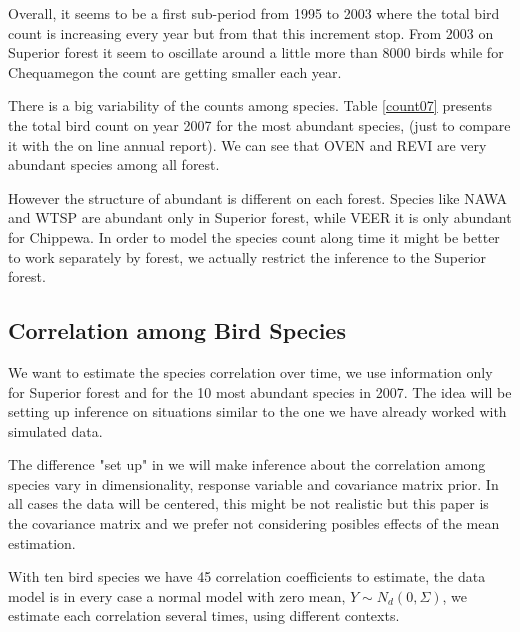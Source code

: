 \documentclass{article}
\begin{document}
Overall, it seems to be a first sub-period from 1995 to 2003 where the total bird count is increasing every year but from that this increment stop. From 2003 on Superior forest it seem to oscillate around a little more than 8000 birds while for Chequamegon the count are getting smaller each year. 



There is a big variability of the counts among species. Table \ref{count07} presents the total bird count on year 2007 for the most abundant species, (just to compare it with the on line annual report). We can see that OVEN and REVI are very abundant species among all forest. 

However the structure of abundant is different on each forest. Species like NAWA and WTSP are abundant only in Superior forest, while VEER it is only abundant for Chippewa. In order to model the species count along time it might be better to work separately by forest, we actually restrict the inference to the Superior forest. 

\subsection{ Correlation among Bird Species}

We want to estimate the species correlation over time, we use information only for Superior forest and for the 10 most abundant species in 2007. The idea will be setting up inference on situations similar to the one we have already worked with simulated data. 

The difference "set up" in we will make inference about the correlation among species vary in dimensionality, response variable and covariance matrix prior. In all cases the data will be centered, this might be not realistic but this paper is the covariance matrix and we prefer not considering posibles effects of the mean estimation.  

With ten bird species we have 45 correlation coefficients to estimate, the data model is in every case a normal model with zero mean, $Y \sim N_d(0, \Sigma)$, we estimate each correlation several times, using different contexts. 
\end{document}
